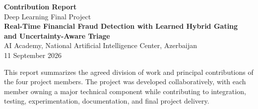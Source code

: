 \documentclass[10pt,a4paper]{article}
\begin{document}

\begin{center}

{\LARGE\bfseries\color{darkgreen}
Contribution Report}\\[4pt]

{\large
Deep Learning Final Project}\\[3pt]

{\bfseries
Real-Time Financial Fraud Detection with Learned Hybrid Gating\\
and Uncertainty-Aware Triage}\\[7pt]

AI Academy, National Artificial Intelligence Center, Azerbaijan\\[2pt]

11 September 2026

\end{center}

\vspace{5pt}


This report summarizes the agreed division of work and principal contributions
of the four project members. The project was developed collaboratively, with
each member owning a major technical component while contributing to integration,
testing, experimentation, documentation, and final project delivery.

\vspace{6pt}


\small
\end{document}
